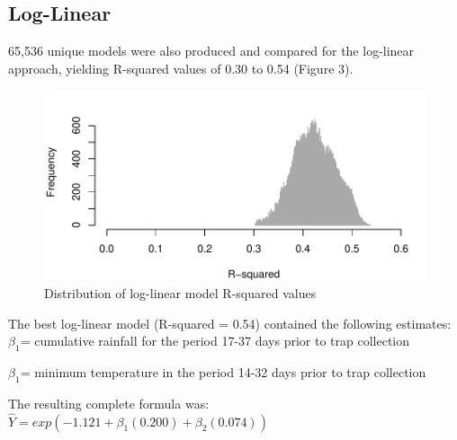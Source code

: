 \documentclass{article}
\begin{document}
\begin{multicols}{2}

\subsection*{Log-Linear}
65,536 unique models were also produced and compared for the log-linear approach, yielding R-squared values of 0.30 to 0.54 (Figure 3).
\vspace{-3mm}
\begin{figure}[H]
\begin{center}  
\includegraphics{mosquitoRainTempArticle-009}
\caption{Distribution of log-linear model R-squared values}
\end{center}
\end{figure}

The best log-linear model (R-squared = 0.54) contained the following estimates:\\

$\beta_1$= cumulative rainfall for the period 17-37 days prior to trap collection 

$\beta_1$= minimum temperature in the period 14-32 days prior to trap collection 

The resulting complete formula was: \\

$\hat{Y}= exp(-1.121+ \beta_1(0.200) + \beta_2(0.074)) $ \\



\end{multicols}
\end{document}
